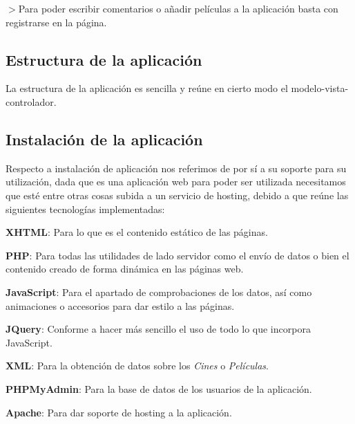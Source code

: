 $>$Para poder escribir comentarios o añadir películas a la aplicación basta con registrarse en la página.

\subsection*{Estructura de la aplicación}

La estructura de la aplicación es sencilla y reúne en cierto modo el modelo-\/vista-\/controlador.


\begin{DoxyCode}{0}
\end{DoxyCode}




\subsection*{Instalación de la aplicación}

Respecto a instalación de aplicación nos referimos de por sí a su soporte para su utilización, dada que es una aplicación web para poder ser utilizada necesitamos que esté entre otras cosas subida a un servicio de hosting, debido a que reúne las siguientes tecnologías implementadas\+:


\begin{DoxyItemize}
\item {\bfseries{X\+H\+T\+ML}}\+: Para lo que es el contenido estático de las páginas.
\item {\bfseries{P\+HP}}\+: Para todas las utilidades de lado servidor como el envío de datos o bien el contenido creado de forma dinámica en las páginas web.
\item {\bfseries{Java\+Script}}\+: Para el apartado de comprobaciones de los datos, así como animaciones o accesorios para dar estilo a las páginas.
\item {\bfseries{J\+Query}}\+: Conforme a hacer más sencillo el uso de todo lo que incorpora Java\+Script.
\item {\bfseries{X\+ML}}\+: Para la obtención de datos sobre los {\itshape Cines} o {\itshape Películas}.
\item {\bfseries{P\+H\+P\+My\+Admin}}\+: Para la base de datos de los usuarios de la aplicación.
\item {\bfseries{Apache}}\+: Para dar soporte de hosting a la aplicación.
\end{DoxyItemize}

